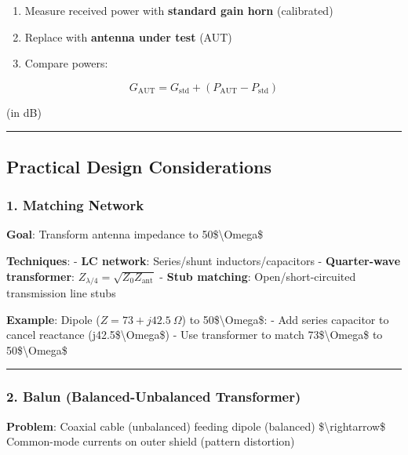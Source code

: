 \begin{enumerate}
\def\labelenumi{\arabic{enumi}.}
\tightlist
\item
  Measure received power with \textbf{standard gain horn} (calibrated)
\item
  Replace with \textbf{antenna under test} (AUT)
\item
  Compare powers:
\end{enumerate}

\[
G_{\text{AUT}} = G_{\text{std}} + (P_{\text{AUT}} - P_{\text{std}})
\]

(in dB)

\begin{center}\rule{0.5\linewidth}{0.5pt}\end{center}

\subsection{Practical Design
Considerations}\label{practical-design-considerations}

\subsubsection{1. Matching Network}\label{matching-network}

\textbf{Goal}: Transform antenna impedance to 50\$\textbackslash Omega\$

\textbf{Techniques}: - \textbf{LC network}: Series/shunt
inductors/capacitors - \textbf{Quarter-wave transformer}:
\(Z_{\lambda/4} = \sqrt{Z_0 Z_{\text{ant}}}\) - \textbf{Stub matching}:
Open/short-circuited transmission line stubs

\textbf{Example}: Dipole (\(Z = 73 + j42.5\ \Omega\)) to
50\$\textbackslash Omega\$: - Add series capacitor to cancel reactance
(j42.5\$\textbackslash Omega\$) - Use transformer to match
73\$\textbackslash Omega\$ to 50\$\textbackslash Omega\$

\begin{center}\rule{0.5\linewidth}{0.5pt}\end{center}

\subsubsection{2. Balun (Balanced-Unbalanced
Transformer)}\label{balun-balanced-unbalanced-transformer}

\textbf{Problem}: Coaxial cable (unbalanced) feeding dipole (balanced)
\$\textbackslash rightarrow\$ Common-mode currents on outer shield
(pattern distortion)

